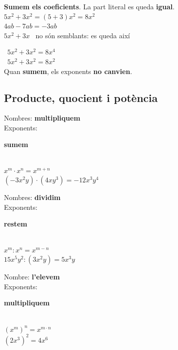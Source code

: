 \documentclass[11pt,a4paper]{article}
\newcommand{\comic}{\fontfamily{ComicNeue-TLF}\selectfont}
\newcommand{\notab}[1]{{\comic\small\color{fmblue}#1}}
\newcommand{\be}[1]{{\color{fmok}\faCheckCircle}\ \ensuremath{#1}}
\newcommand{\mal}[1]{{\color{fmR}\faTimesCircle}\ {\color{fmR}\ensuremath{#1}}}
\newcommand{\fmkey}[1]{\colorbox{fmyellow!55}{\strut #1}}
\begin{document}
\vfill
\begin{minipage}[t]{0.52\linewidth}
\begin{idea}
\textbf{Sumem els coeficients}. La part literal es queda \textbf{igual}.\\[4pt]
$5x^2+3x^2=(5+3)x^2=8x^2$\\[2pt]
$4ab-7ab=-3ab$\\[2pt]
$5x^2+3x$ \ \notab{no són semblants: es queda així}
\end{idea}
\end{minipage}\hfill
\begin{minipage}[t]{0.45\linewidth}
\begin{compte}
\mal{5x^2+3x^2=8x^4}\\[3pt]
\be{5x^2+3x^2=8x^2}\\[3pt]
Quan \textbf{sumem}, els exponents \textbf{no canvien}.
\end{compte}
\end{minipage}

\vfill
\subsection{Producte, quocient i potència}
\begin{tcbraster}[raster columns=3,raster equal height,raster column skip=8pt]
\begin{tcolorbox}[fmbase,colback=fmdefbg,colframe=fmdef,coltitle=white,title={\faTimes\ \ Producte},before upper=\centering]
Nombres: \textbf{multipliquem}\\ Exponents: \fmkey{\textbf{sumem}}\\[3pt]
{\large$x^m\cdot x^n=x^{m+n}$}\\[4pt]
$(-3x^2y)\cdot(4xy^3)=-12x^3y^4$
\end{tcolorbox}
\begin{tcolorbox}[fmbase,colback=fmdefbg,colframe=fmdef,coltitle=white,title={\faDivide\ \ Quocient},before upper=\centering]
Nombres: \textbf{dividim}\\ Exponents: \fmkey{\textbf{restem}}\\[3pt]
{\large$x^m:x^n=x^{m-n}$}\\[4pt]
$15x^5y^2:(3x^2y)=5x^3y$
\end{tcolorbox}
\begin{tcolorbox}[fmbase,colback=fmdefbg,colframe=fmdef,coltitle=white,title={\faSuperscript\ \ Potència},before upper=\centering]
Nombre: \textbf{l'elevem}\\ Exponents: \fmkey{\textbf{multipliquem}}\\[3pt]
{\large$(x^m)^n=x^{m\cdot n}$}\\[4pt]
$(2x^3)^2=4x^6$
\end{tcolorbox}
\end{tcbraster}
\end{document}
